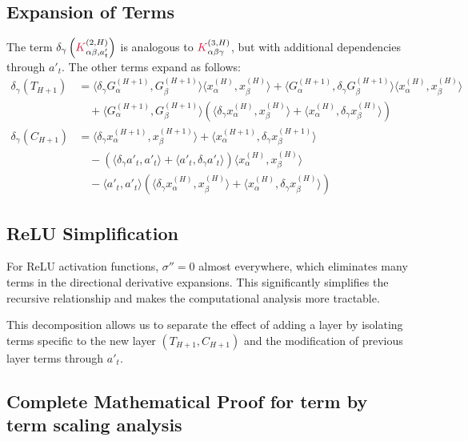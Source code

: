 \documentclass[a4paper]{article}
\theoremstyle{plain}
\theoremstyle{definition}
\theoremstyle{remark}
\begin{document}
\subsection{Expansion of Terms}

The term $\delta_\gamma \left(\textcolor{kernelcolor}{K}^{(2,H)}_{\alpha\beta, a'_t} \right)$ is analogous to $\textcolor{kernelcolor}{K}^{(3,H)}_{\alpha\beta\gamma}$, but with additional dependencies through $a'_t$. The other terms expand as follows:
\begin{align}
\delta_\gamma(T_{H+1}) &= \langle \delta_\gamma G^{(H+1)}_\alpha, G^{(H+1)}_\beta \rangle \langle x^{(H)}_\alpha, x^{(H)}_\beta \rangle + \langle G^{(H+1)}_\alpha, \delta_\gamma G^{(H+1)}_\beta \rangle \langle x^{(H)}_\alpha, x^{(H)}_\beta \rangle \\
&\quad + \langle G^{(H+1)}_\alpha, G^{(H+1)}_\beta \rangle \left( \langle \delta_\gamma x^{(H)}_\alpha, x^{(H)}_\beta \rangle + \langle x^{(H)}_\alpha, \delta_\gamma x^{(H)}_\beta \rangle \right) \\
\delta_\gamma(C_{H+1}) &= \langle \delta_\gamma x^{(H+1)}_\alpha, x^{(H+1)}_\beta \rangle + \langle x^{(H+1)}_\alpha, \delta_\gamma x^{(H+1)}_\beta \rangle \\
&\quad - \left( \langle \delta_\gamma a'_t, a'_t \rangle + \langle a'_t, \delta_\gamma a'_t \rangle \right) \langle x^{(H)}_\alpha, x^{(H)}_\beta \rangle \\
&\quad - \langle a'_t, a'_t \rangle \left( \langle \delta_\gamma x^{(H)}_\alpha, x^{(H)}_\beta \rangle + \langle x^{(H)}_\alpha, \delta_\gamma x^{(H)}_\beta \rangle \right)
\end{align}

\subsection{ReLU Simplification}

For ReLU activation functions, $\sigma''=0$ almost everywhere, which eliminates many terms in the directional derivative expansions. This significantly simplifies the recursive relationship and makes the computational analysis more tractable.

This decomposition allows us to separate the effect of adding a layer by isolating terms specific to the new layer $(T_{H+1}, C_{H+1})$ and the modification of previous layer terms through $a'_t$.






\subsection{Complete Mathematical Proof for term by term scaling analysis}
\end{document}
